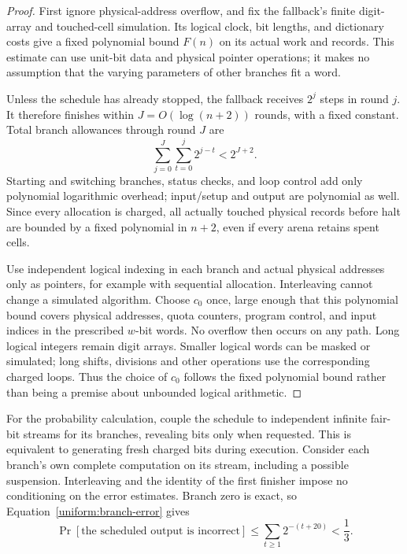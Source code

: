 \begin{proof}
First ignore physical-address overflow, and fix the fallback's finite
digit-array and touched-cell simulation. Its logical clock, bit lengths,
and dictionary costs give a fixed polynomial bound $F(n)$ on its actual
work and records. This estimate can use unit-bit data and physical pointer
operations; it makes no assumption that the varying parameters of other
branches fit a word.

Unless the schedule has already stopped, the fallback receives $2^j$ steps
in round $j$. It therefore finishes within $J=O(\log(n+2))$ rounds, with
a fixed constant. Total branch allowances through round $J$ are
\[
 \sum_{j=0}^J\sum_{t=0}^j2^{j-t}<2^{J+2}.
\]
Starting and switching branches, status checks, and loop control add only
polynomial logarithmic overhead; input/setup and output are polynomial
as well. Since every allocation is charged, all actually touched physical
records before halt are bounded by a fixed polynomial in $n+2$, even
if every arena retains spent cells.

Use independent logical indexing in each branch and actual physical
addresses only as pointers, for example with sequential allocation.
Interleaving cannot change a simulated algorithm. Choose $c_0$ once,
large enough that this polynomial bound covers physical addresses,
quota counters, program control, and input indices in the prescribed
$w$-bit words. No overflow then occurs on any path. Long logical integers
remain digit arrays. Smaller logical words can be masked or simulated;
long shifts, divisions and other operations use the corresponding charged
loops. Thus the choice of $c_0$ follows the fixed polynomial bound rather
than being a premise about unbounded logical arithmetic.
\end{proof}

For the probability calculation, couple the schedule to independent
infinite fair-bit streams for its branches, revealing bits only when
requested. This is equivalent to generating fresh charged bits during
execution. Consider each branch's own complete computation on its stream,
including a possible suspension. Interleaving and the identity of the
first finisher impose no conditioning on the error estimates.
Branch zero is exact, so Equation~\eqref{uniform:branch-error} gives
\begin{equation}\label{uniform:total-error}
 \Pr[\text{the scheduled output is incorrect}]
 \le\sum_{t\ge1}2^{-(t+20)}<\frac13.
\end{equation}

